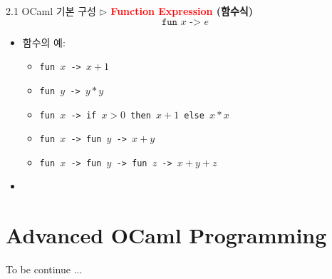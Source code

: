 \documentclass[10pt]{beamer}
\begin{document}
	\begin{frame}{2.1 OCaml 기본 구성}
		\textbf{$\triangleright$ \textcolor{red}{Function Expression} (함수식)}
		\[
		\texttt{fun $x$ -> $e$}
		\] 
		\begin{itemize}
			\item 함수의 예:
			\begin{itemize}
				\item \texttt{fun $x$ -> $x+1$}
				\item \texttt{fun $y$ -> $y*y$}
				\item \texttt{fun $x$ -> if $x>0$ then $x+1$ else $x*x$}
				\item \texttt{fun $x$ -> fun $y$ -> $x+y$}
				\item \texttt{fun $x$ -> fun $y$ -> fun $z$ -> $x+y+z$}
			\end{itemize}
			\item 
		\end{itemize}
	\end{frame}
%
%	
%	
%	

	\section{Advanced OCaml Programming}
	
	\newpage
	{
		\begin{frame}[standout]
			To be continue ...
		\end{frame}
	}
	
	
\end{document}
